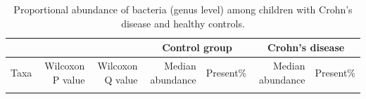 \newpage
{\footnotesize
\renewcommand{\arraystretch}{0.7} \setlength{\tabcolsep}{3pt}
\begin{longtable}{ | l | r | r | r | r | r | r  | }
\caption[Proportional abundance of bacteria (genus level) among children with Crohn’s disease and healthy controls]{Proportional abundance of bacteria (genus level) among children with Crohn’s disease and healthy controls.} 
\label{TS2} \\


\hline
\multicolumn{3}{|c|}{} & \multicolumn{2}{c}{Control group}
& \multicolumn{2}{|c|}{Crohn's disease}\\
\hline 
Taxa & Wilcoxon P value & Wilcoxon Q value & Median abundance & Present\% & Median abundance & Present\% \\ 
\hline 
\endfirsthead


\endfoot

\hline 
\endlastfoot





\end{longtable}}
